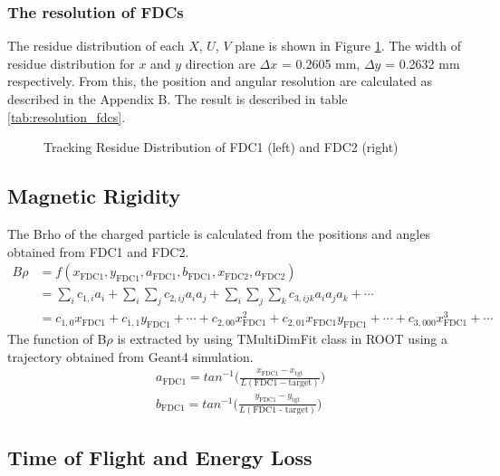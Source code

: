 \subsubsection{The resolution of FDCs}
The residue distribution of each $X$, $U$, $V$ plane is shown in Figure \ref{fig:residue_fdcs}. The width of residue distribution for $x$ and $y$ direction are $\Delta x$ = 0.2605 mm, $\Delta y$ = 0.2632 mm respectively. From this, the position and angular resolution are calculated as described in the Appendix B. The result is described in table \ref{tab:resolution_fdcs}.
 \begin{figure}
    \centering
    \caption[Tracking Residue Distribution of FDCs]{Tracking Residue Distribution of FDC1 (left) and FDC2 (right)}
    \label{fig:residue_fdcs}
\end{figure}

\subsection{Magnetic Rigidity}
The Brho of the charged particle is calculated from the positions and angles obtained from FDC1 and FDC2. 
\begin{align}
    B\rho &= f(x_{\text{FDC1}}, y_{\text{FDC1}}, a_{\text{FDC1}}, b_{\text{FDC1}}, x_{\text{FDC2}}, a_{\text{FDC2}})\\
    &= \sum_{i} c_{1,i} a_i + \sum_{i}\sum_{j} c_{2,ij} a_i a_j + \sum_{i}\sum_{j}\sum_{k} c_{3,ijk} a_i a_j a_k + \cdots \\
    &= c_{1,0} x_{\text{FDC1}} + c_{1,1} y_{\text{FDC1}} + \cdots + c_{2,00} x_{\text{FDC1}}^2 + c_{2,01} x_{\text{FDC1}} y_{\text{FDC1}} + \cdots + c_{3,000} x_{\text{FDC1}}^3 + \cdots
\end{align}
The function of B$\rho$ is extracted by using TMultiDimFit class in ROOT using a trajectory obtained from Geant4 simulation.
\begin{align}
    &a_{\text{FDC1}} = tan^{-1} \bigg( \frac{x_{\text{FDC1}} - x_{\text{tgt}}}{L(\text{FDC1} - \text{target})} \bigg)\\
    &b_{\text{FDC1}} = tan^{-1} \bigg( \frac{y_{\text{FDC1}} - y_{\text{tgt}}}{L(\text{FDC1 - target})} \bigg)
\end{align}

\subsection{Time of Flight and Energy Loss}
